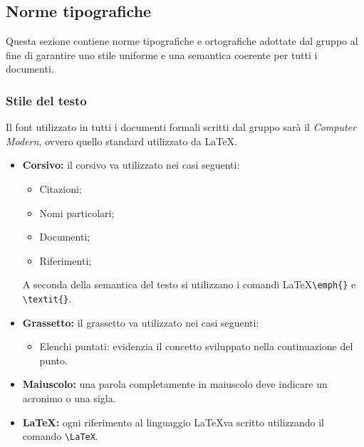 \documentclass[a4paper]{report}
\begin{document}
	\subsection{Norme tipografiche}
		Questa sezione contiene norme tipografiche e ortografiche adottate dal gruppo al fine di garantire uno stile
		uniforme e una semantica coerente per tutti i documenti.  
	\subsubsection{Stile del testo}
		Il font utilizzato in tutti i documenti formali scritti dal gruppo sarà il \emph{Computer Modern}, ovvero
		quello standard utilizzato da \LaTeX.
	\begin{itemize}
		\item \textbf{Corsivo:} il corsivo va utilizzato nei casi seguenti:
		\begin{itemize}
			\item Citazioni;
			\item Nomi particolari;
			\item Documenti;
			\item Riferimenti;
		\end{itemize}
		A seconda della semantica del testo si utilizzano i comandi \LaTeX \space \verb|\emph{}| e \verb|\textit{}|.
		\item \textbf{Grassetto:} il grassetto va utilizzato nei casi seguenti:
		\begin{itemize}
			\item Elenchi puntati: evidenzia il concetto sviluppato nella continuazione del punto.
		\end{itemize}
		\item \textbf{Maiuscolo:} una parola completamente in maiuscolo deve indicare un acronimo o una sigla.
		\item \textbf{\LaTeX:} ogni riferimento al linguaggio \LaTeX \space va scritto utilizzando il comando
		\verb|\LaTeX|.
	\end{itemize}
\end{document}
